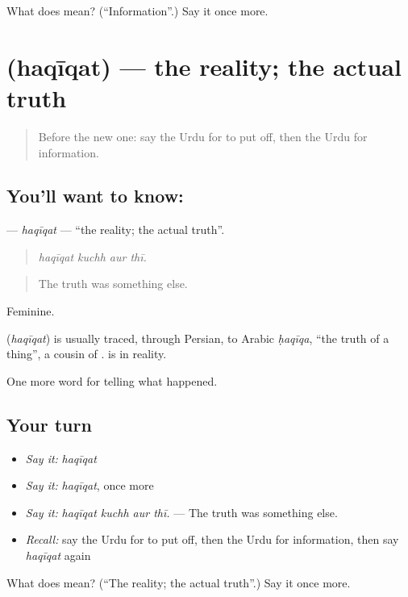 \begin{tcolorbox}[breakable,colback=teal!4,colframe=teal!35!black,title={Before you move on}]
What does  mean? (\textquotedblleft{}Information\textquotedblright{}.) Say it once more.
\end{tcolorbox}
\section[\texorpdfstring{\ur{حقیقت} (haqīqat)}{حقیقت (haqīqat)}]{ (haqīqat) — the reality; the actual truth}

\label{lesson:UR-C303-haqiqat}



\begin{quote}
Before the new one: say the Urdu for to put off, then the Urdu for information.
\end{quote}

\subsection*{You'll want to know: }
\textbf{} — \emph{haqīqat} — \textquotedblleft{}the reality; the actual truth\textquotedblright{}.

\begin{quote}
   
\end{quote}

\begin{quote}
\emph{haqīqat kuchh aur thī.}
\end{quote}

\begin{quote}
The truth was something else.
\end{quote}

Feminine.

\begin{cousinweb}
\textbf{} (\emph{haqīqat}) is usually traced, through Persian, to Arabic \emph{ḥaqīqa}, \textquotedblleft{}the truth of a thing\textquotedblright{}, a cousin of \textbf{}. \textbf{ } is in reality.
\end{cousinweb}

\begin{grammarlens}[title={What you've built}]
One more word for telling what happened.
\end{grammarlens}

\subsection*{Your turn}
\begin{itemize}
\raggedright
  \item \emph{Say it:} \emph{haqīqat}
  \item \emph{Say it:} \emph{haqīqat}, once more
  \item \emph{Say it:} \emph{haqīqat kuchh aur thī.} — The truth was something else.
  \item \emph{Recall:} say the Urdu for to put off, then the Urdu for information, then say \emph{haqīqat} again
\end{itemize}

\begin{tcolorbox}[breakable,colback=teal!4,colframe=teal!35!black,title={Before you move on}]
What does  mean? (\textquotedblleft{}The reality; the actual truth\textquotedblright{}.) Say it once more.
\end{tcolorbox}
